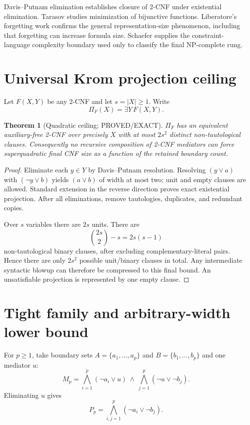 \documentclass[11pt]{article}
\newtheorem{theorem}{Theorem}
\begin{document}
Davis--Putnam elimination establishes closure of 2-CNF under existential elimination. Tarasov studies minimization of bijunctive functions. Liberatore's forgetting work confirms the general representation-size phenomenon, including that forgetting can increase formula size. Schaefer supplies the constraint-language complexity boundary used only to classify the final NP-complete rung.

\section{Universal Krom projection ceiling}
Let $F(X,Y)$ be any 2-CNF and let $s=|X|\ge1$. Write
\[
  \Pi_F(X)=\exists Y\,F(X,Y).
\]

\begin{theorem}[Quadratic ceiling; PROVED/EXACT]
$\Pi_F$ has an equivalent auxiliary-free 2-CNF over precisely $X$ with at most $2s^2$ distinct non-tautological clauses. Consequently no recursive composition of 2-CNF mediators can force superquadratic final CNF size as a function of the retained boundary count.
\end{theorem}
\begin{proof}
Eliminate each $y\in Y$ by Davis--Putnam resolution. Resolving $(y\vee a)$ with $(\neg y\vee b)$ yields $(a\vee b)$ of width at most two; unit and empty clauses are allowed. Standard extension in the reverse direction proves exact existential projection. After all eliminations, remove tautologies, duplicates, and redundant copies.

Over $s$ variables there are $2s$ units. There are
\[
  \binom{2s}{2}-s=2s(s-1)
\]
non-tautological binary clauses, after excluding complementary-literal pairs. Hence there are only $2s^2$ possible unit/binary clauses in total. Any intermediate syntactic blowup can therefore be compressed to this final bound. An unsatisfiable projection is represented by one empty clause.
\end{proof}

\section{Tight family and arbitrary-width lower bound}
For $p\ge1$, take boundary sets $A=\{a_1,\ldots,a_p\}$ and $B=\{b_1,\ldots,b_p\}$ and one mediator $u$:
\[
M_p=\bigwedge_{i=1}^{p}(\neg a_i\vee u)
\ \land\
\bigwedge_{j=1}^{p}(\neg u\vee\neg b_j).
\]
Eliminating $u$ gives
\[
P_p=\bigwedge_{i,j=1}^{p}(\neg a_i\vee\neg b_j).
\]
\end{document}
